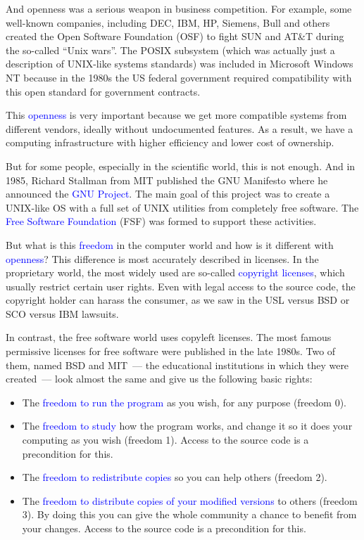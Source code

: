 \documentclass[12pt]{report}
\newcommand{\struct}[1]{\textcolor{blue}{#1}}
\begin{document}
\medskip
And openness was a serious weapon in business competition. For example,
some well-known companies, including DEC, IBM, HP, Siemens, Bull and others
created the Open Software Foundation (OSF) to fight SUN and AT\&T during
the so-called ``Unix wars''. The POSIX subsystem (which was actually just
a description of UNIX-like systems standards) was included in Microsoft
Windows NT because in the 1980s the US federal government required
compatibility with this open standard for government contracts.

\medskip
This \struct{openness} is very important because we get more compatible systems
from different vendors, ideally without undocumented features. As a result,
we have a computing infrastructure with higher efficiency and lower cost of
ownership.

\medskip
But for some people, especially in the scientific world, this is not enough.
And in 1985, Richard Stallman from MIT published the GNU Manifesto where
he announced the \struct{GNU Project}. The main goal of this project was
to create a UNIX-like OS with a full set of UNIX utilities from completely
free software. The \struct{Free Software Foundation} (FSF) was formed
to support these activities.

\medskip
But what is this \struct{freedom} in the computer world and how is it different
with \struct{openness}? This difference is most accurately described in licenses.
In the proprietary world, the most widely used are so-called \struct{copyright
licenses}, which usually restrict certain user rights. Even with legal access
to the source code, the copyright holder can harass the consumer, as we saw
in the USL versus BSD or SCO versus IBM lawsuits.

\medskip
In contrast, the free software world uses copyleft licenses. The most famous
permissive licenses for free software were published in the late 1980s.
Two of them, named BSD and MIT~--- the educational institutions in which
they were created~--- look almost the same and give us the following basic rights:
\begin{itemize}
\item The \struct{freedom to run the program} as you wish, for any purpose
      (freedom 0).
\item The \struct{freedom to study} how the program works, and change it so
      it does your computing as you wish (freedom 1). Access to the source code
      is a precondition for this.
\item The \struct{freedom to redistribute copies} so you can help others
      (freedom 2).
\item The \struct{freedom to distribute copies of your modified versions}
      to others (freedom 3). By doing this you can give the whole community
      a chance to benefit from your changes. Access to the source code is
      a precondition for this.
\end{itemize}
\end{document}
